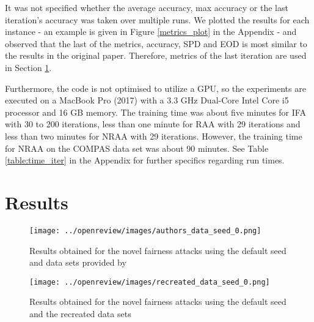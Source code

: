 It was not specified whether the average accuracy, max accuracy or the last iteration's accuracy was taken over multiple runs. We plotted the results for each instance - an example is given in Figure \ref{metrics_plot} in the Appendix - and observed that the last of the metrics, accuracy, SPD and EOD is most similar to the results in the original paper. Therefore, metrics of the last iteration are used in Section \ref{sec:results}.

Furthermore, the code is not optimised to utilize a GPU, so the experiments are executed on a MacBook Pro (2017) with a 3.3 GHz Dual-Core Intel Core i5 processor and 16 GB memory. The training time was about five minutes for IFA with 30 to 200 iterations, less than one minute for RAA with 29 iterations and less than two minutes for NRAA with 29 iterations. However, the training time for NRAA on the COMPAS data set was about 90 minutes. See Table \ref{table:time_iter} in the Appendix for further specifics regarding run times.


\section{Results}
\label{sec:results}


\begin{figure}[h!]
\texttt{[image: ../openreview/images/authors\_data\_seed\_0.png]}
\centering
\caption{Results obtained for the novel fairness attacks using the default seed and data sets provided by \cite{mehrabi2020exacerbating}}
\label{authors_seed0}
\end{figure}

\begin{figure}[h!]
\texttt{[image: ../openreview/images/recreated\_data\_seed\_0.png]}
\centering
\caption{Results obtained for the novel fairness attacks using the default seed and the recreated data sets}
\label{recreated_seed0}
\end{figure}

